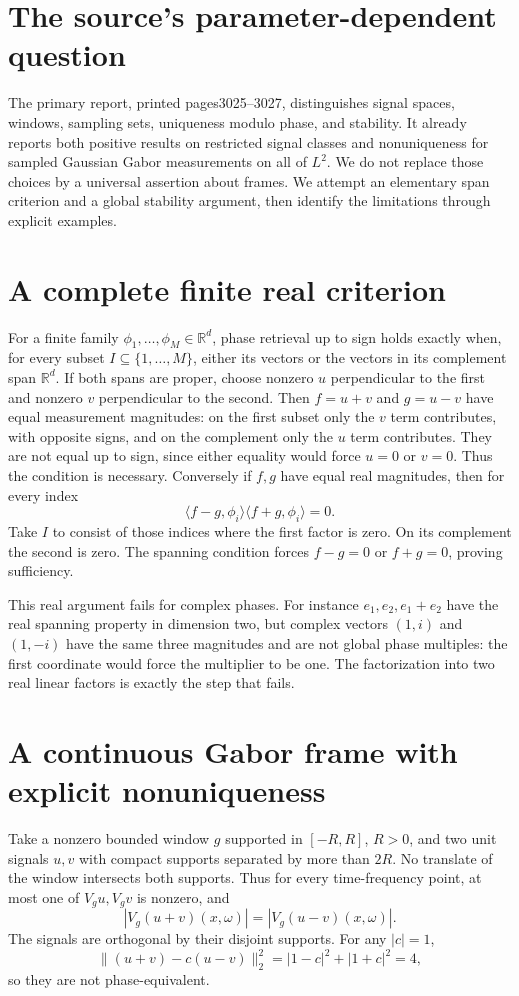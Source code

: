 \documentclass[11pt]{article}
\begin{document}
\section{The source's parameter-dependent question}
The primary report, printed pages3025--3027, distinguishes signal
spaces, windows, sampling sets, uniqueness modulo phase, and
stability. It already reports both positive results on restricted
signal classes and nonuniqueness for sampled Gaussian Gabor
measurements on all of $L^2$. We do not replace those choices
by a universal assertion about frames. We attempt an elementary
span criterion and a global stability argument, then identify
the limitations through explicit examples.

\section{A complete finite real criterion}
For a finite family $\phi_1,\ldots,\phi_M\in\mathbb R^d$,
phase retrieval up to sign holds exactly when, for every subset
$I\subseteq\{1,\ldots,M\}$, either its vectors or the vectors
in its complement span $\mathbb R^d$.
If both spans are proper, choose nonzero $u$ perpendicular to
the first and nonzero $v$ perpendicular to the second. Then
$f=u+v$ and $g=u-v$ have equal measurement magnitudes:
on the first subset only the $v$ term contributes, with opposite
signs, and on the complement only the $u$ term contributes.
They are not equal up to sign, since either equality would force
$u=0$ or $v=0$. Thus the condition is necessary.
Conversely if $f,g$ have equal real magnitudes, then for every
index
\[
 \langle f-g,\phi_i\rangle\langle f+g,\phi_i\rangle=0.
\]
Take $I$ to consist of those indices where the first factor is
zero. On its complement the second is zero. The spanning
condition forces $f-g=0$ or $f+g=0$, proving sufficiency.

This real argument fails for complex phases. For instance
$e_1,e_2,e_1+e_2$ have the real spanning property in dimension
two, but complex vectors $(1,i)$ and $(1,-i)$ have the same
three magnitudes and are not global phase multiples: the first
coordinate would force the multiplier to be one. The factorization
into two real linear factors is exactly the step that fails.

\section{A continuous Gabor frame with explicit nonuniqueness}
Take a nonzero bounded window $g$ supported in $[-R,R]$,
$R>0$, and two unit signals $u,v$ with compact supports
separated by more than $2R$. No translate of the window
intersects both supports. Thus for every time-frequency point,
at most one of $V_gu,V_gv$ is nonzero, and
\[
 |V_g(u+v)(x,\omega)|=|V_g(u-v)(x,\omega)|.
\]
The signals are orthogonal by their disjoint supports. For
any $|c|=1$,
\[
 \|(u+v)-c(u-v)\|_2^2
 =|1-c|^2+|1+c|^2=4,
\]
so they are not phase-equivalent.
\end{document}
